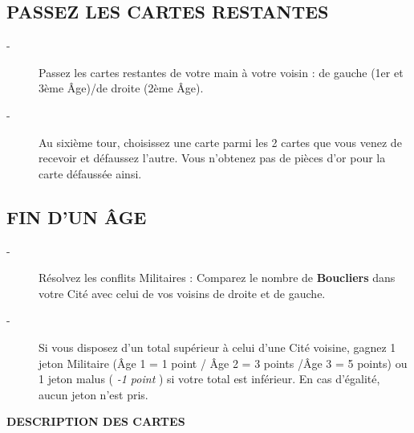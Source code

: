\documentclass{article}%
\begin{document}
%
\subsection{ PASSEZ LES CARTES RESTANTES
}%
\label{subsec:PASSEZLESCARTESRESTANTES}%
\begin{description}%
\item[{-} ]%
%
 Passez les cartes restantes de votre main à votre voisin : de gauche (1er et 3ème Âge)/de droite (2ème Âge).
%
\item[{-} ]%
%
 Au sixième tour, choisissez une carte parmi les 2 cartes que vous venez de recevoir et défaussez l'autre. Vous n'obtenez pas de pièces d'or pour la carte défaussée ainsi.
%
\end{description}

%
\subsection{ FIN D’UN ÂGE
}%
\label{subsec:FINDUNGE}%
\begin{description}%
\item[{-} ]%
%
 Résolvez les conflits Militaires : Comparez le nombre de %
\textbf{Boucliers}%
\textit{ }%
 dans votre Cité avec celui de vos voisins de droite et de gauche.
%
\item[{-} ]%
%
 Si vous disposez d’un total supérieur à celui d’une Cité voisine, gagnez 1 jeton Militaire (Âge 1 = 1 point / Âge 2 = 3 points /Âge 3 = 5 points) ou 1 jeton malus (%
\textit{{-}1 point}%
) si votre total est inférieur. En cas d'égalité, aucun jeton n’est pris.
%
\end{description}%
\textbf{DESCRIPTION DES CARTES}%
\end{document}
